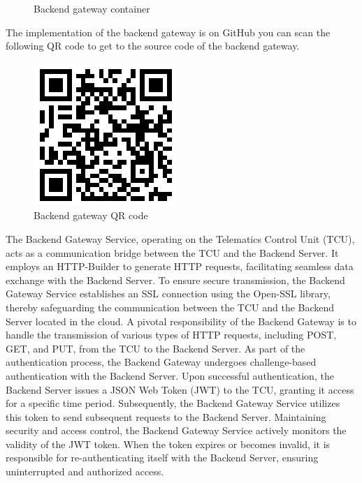 \documentclass[
12pt,
oneside, 
onehalfspacing, 
nolistspacing, 
parskip, 
chapterinoneline, 
]{AASTCOMPUTER}
\begin{document}
\begin{figure}[!ht]
\begin{minipage}{0.45\textwidth}
  \caption[Backend gateway container]{Backend gateway container}
  \label{fig:Backend Gateway container}
\end{minipage}
\end{figure}
The implementation of the backend gateway is on GitHub you can scan the following QR code to get to the source code of the backend gateway.

\begin{figure}[!ht]
\centering
\includegraphics[scale=1]{Figures/backend_gateway_QR.png}
\caption[Backend gateway QR code]{Backend gateway QR code}
\label{fig:SOME/IP On-wire format}
\end{figure}


The Backend Gateway Service, operating on the Telematics Control Unit (TCU), acts as a communication bridge between the TCU and the Backend Server. It employs an HTTP-Builder to generate HTTP requests, facilitating seamless data exchange with the Backend Server. To ensure secure transmission, the Backend Gateway Service establishes an SSL connection using the Open-SSL library, thereby safeguarding the communication between the TCU and the Backend Server located in the cloud. 
A pivotal responsibility of the Backend Gateway is to handle the transmission of various types of HTTP requests, including POST, GET, and PUT, from the TCU to the Backend Server. As part of the authentication process, the Backend Gateway undergoes challenge-based authentication with the Backend Server. Upon successful authentication, the Backend Server issues a JSON Web Token (JWT) to the TCU, granting it access for a specific time period. Subsequently, the Backend Gateway Service utilizes this token to send subsequent requests to the Backend Server.
Maintaining security and access control, the Backend Gateway Service actively monitors the validity of the JWT token. When the token expires or becomes invalid, it is responsible for re-authenticating itself with the Backend Server, ensuring uninterrupted and authorized access.
\end{document}
